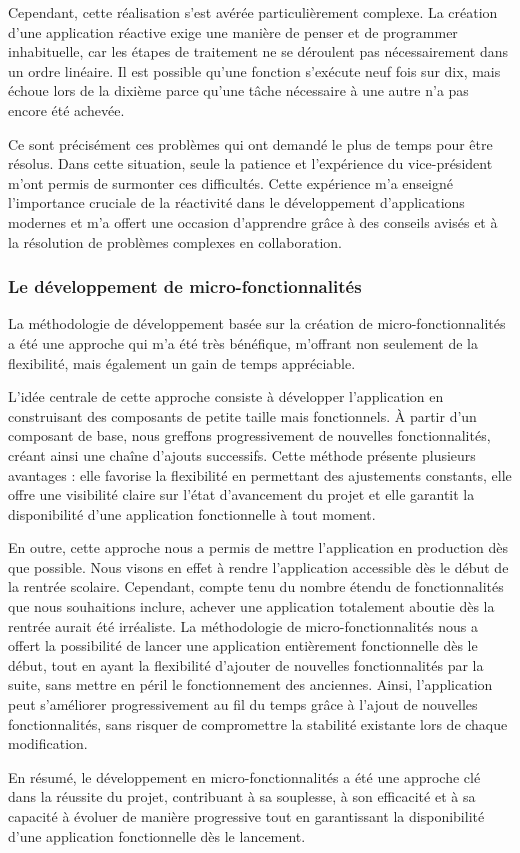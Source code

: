 Cependant, cette réalisation s'est avérée particulièrement complexe. La création d'une application réactive exige une manière de penser et de programmer inhabituelle, car les étapes de traitement ne se déroulent pas nécessairement dans un ordre linéaire. Il est possible qu'une fonction s'exécute neuf fois sur dix, mais échoue lors de la dixième parce qu'une tâche nécessaire à une autre n'a pas encore été achevée.

Ce sont précisément ces problèmes qui ont demandé le plus de temps pour être résolus. Dans cette situation, seule la patience et l'expérience du vice-président m'ont permis de surmonter ces difficultés. Cette expérience m'a enseigné l'importance cruciale de la réactivité dans le développement d'applications modernes et m'a offert une occasion d'apprendre grâce à des conseils avisés et à la résolution de problèmes complexes en collaboration.

\subsubsection{Le développement de micro-fonctionnalités}

La méthodologie de développement basée sur la création de micro-fonctionnalités a été une approche qui m'a été très bénéfique, m'offrant non seulement de la flexibilité, mais également un gain de temps appréciable.

L'idée centrale de cette approche consiste à développer l'application en construisant des composants de petite taille mais fonctionnels. À partir d'un composant de base, nous greffons progressivement de nouvelles fonctionnalités, créant ainsi une chaîne d'ajouts successifs. Cette méthode présente plusieurs avantages : elle favorise la flexibilité en permettant des ajustements constants, elle offre une visibilité claire sur l'état d'avancement du projet et elle garantit la disponibilité d'une application fonctionnelle à tout moment.

En outre, cette approche nous a permis de mettre l'application en production dès que possible. Nous visons en effet à rendre l'application accessible dès le début de la rentrée scolaire. Cependant, compte tenu du nombre étendu de fonctionnalités que nous souhaitions inclure, achever une application totalement aboutie dès la rentrée aurait été irréaliste. La méthodologie de micro-fonctionnalités nous a offert la possibilité de lancer une application entièrement fonctionnelle dès le début, tout en ayant la flexibilité d'ajouter de nouvelles fonctionnalités par la suite, sans mettre en péril le fonctionnement des anciennes. Ainsi, l'application peut s'améliorer progressivement au fil du temps grâce à l'ajout de nouvelles fonctionnalités, sans risquer de compromettre la stabilité existante lors de chaque modification.

En résumé, le développement en micro-fonctionnalités a été une approche clé dans la réussite du projet, contribuant à sa souplesse, à son efficacité et à sa capacité à évoluer de manière progressive tout en garantissant la disponibilité d'une application fonctionnelle dès le lancement.